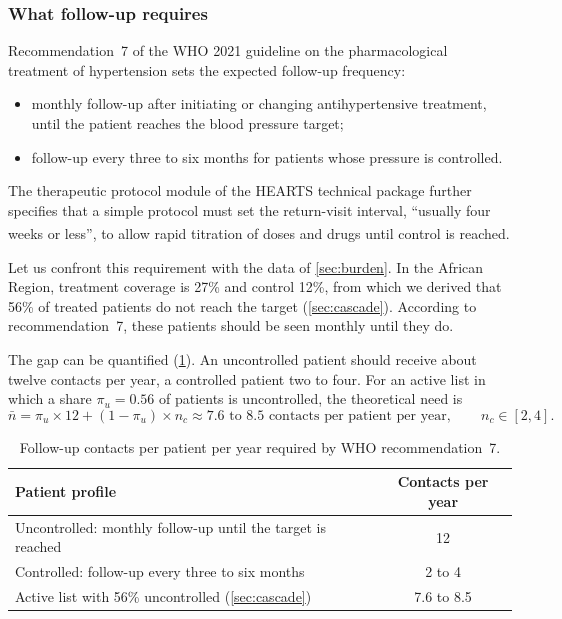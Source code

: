 \documentclass[12pt,a4paper,oneside]{report}
\newcommand{\bq}[1]{``#1''\textsuperscript{\dag}}
\begin{document}
\subsubsection{What follow-up requires}\label{sec:followup-requires}

Recommendation~7 of the WHO 2021 guideline on the pharmacological treatment of hypertension \parencite{who2021guideline} sets the expected follow-up frequency:
\begin{itemize}[nosep]
  \item monthly follow-up after initiating or changing antihypertensive treatment, until the patient reaches the blood pressure target;
  \item follow-up every three to six months for patients whose pressure is controlled.
\end{itemize}
The therapeutic protocol module of the HEARTS technical package \parencite{whoHEARTS} further specifies that a simple protocol must set the return-visit interval, \bq{usually four weeks or less}, to allow rapid titration of doses and drugs until control is reached.

Let us confront this requirement with the data of \cref{sec:burden}. In the African Region, treatment coverage is 27\% and control 12\%, from which we derived that 56\% of treated patients do not reach the target (\cref{sec:cascade}). According to recommendation~7, these patients should be seen monthly until they do.

The gap can be quantified (\cref{tab:contacts}). An uncontrolled patient should receive about twelve contacts per year, a controlled patient two to four. For an active list in which a share $\pi_u = 0.56$ of patients is uncontrolled, the theoretical need is
\begin{equation}
  \bar n = \pi_u \times 12 + (1-\pi_u)\times n_c \approx 7.6 \text{ to } 8.5 \text{ contacts per patient per year}, \qquad n_c \in [2,4].
\end{equation}

\begin{table}[htbp]
\centering\small
\caption{Follow-up contacts per patient per year required by WHO recommendation~7.}\label{tab:contacts}
\begin{tabularx}{\textwidth}{@{}X c@{}}
\toprule
\textbf{Patient profile} & \textbf{Contacts per year} \\
\midrule
Uncontrolled: monthly follow-up until the target is reached & 12 \\
Controlled: follow-up every three to six months & 2 to 4 \\
Active list with 56\% uncontrolled (\cref{sec:cascade}) & 7.6 to 8.5 \\
\bottomrule
\end{tabularx}
\end{table}
\end{document}
